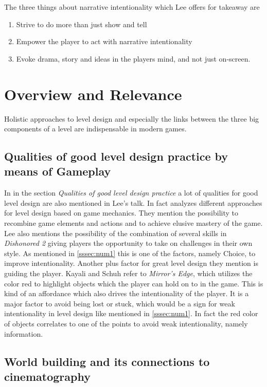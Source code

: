 \documentclass[a4paper]{article}
\begin{document}
The three things about narrative intentionality which Lee offers for takeaway are
\begin{enumerate}
\item Strive to do more than just show and tell
\item Empower the player to act with narrative intentionality
\item Evoke drama, story and ideas in the players mind, and not just on-screen.
\end{enumerate}

\section{Overview and Relevance}
Holistic approaches to level design and especially the links between the three big components of a level are indispensable in modern games. 

\subsection{Qualities of good level design practice by means of Gameplay}

In \cite{kayalischuh11} in the section \textit{Qualities of good level design practice} a lot of qualities for good level design are also mentioned in Lee's talk. In fact \cite{kayalischuh11} analyzes different approaches for level design based on game mechanics.
They mention the possibility to recombine game elements and actions and to achieve elusive mastery of the game. Lee also mentions the possibility of the combination of several skills in \textit{Dishonored 2} giving players the opportunity to take on challenges in their own style. As mentioned in \ref{sssec:num1} this is one of the factors, namely Choice, to improve intentionality.
Another plus factor for great level design they mention is guiding the player. Kayali and Schuh refer to \textit{Mirror's Edge}, which utilizes the color red to highlight objects which the player can hold on to in the game. This is kind of an affordance which also drives the intentionality of the player. It is a major factor to avoid being lost or stuck, which would be a sign for weak intentionality in level design like mentioned in \ref{sssec:num1}. In fact the red color of objects correlates to one of the points to avoid weak intentionality, namely information.

\subsection{World building and its connections to cinematography}
\end{document}

